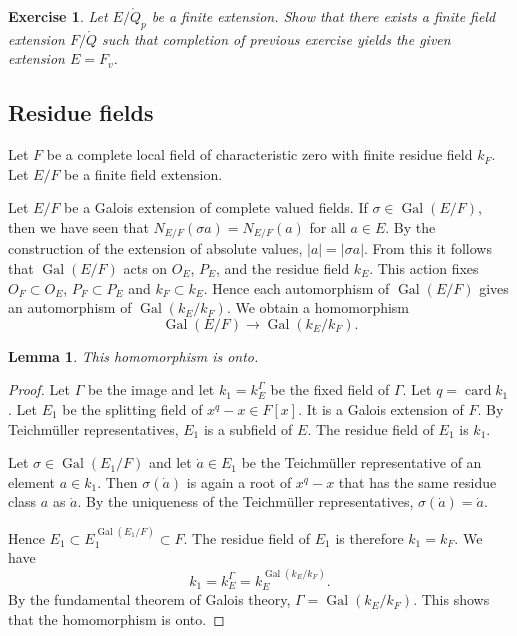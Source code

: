 \documentclass{amsart}
\newtheorem{lemma}[equation]{Lemma}
\newtheorem{exercise}{Exercise}
\def\card#1{\op{card}{#1}}
\def\abs#1{{|#1|}}
\def\op#1{{\operatorname{#1}}}
\def\oG{\op{Gal}}
\begin{document}

\begin{exercise}  Let $E/\ring{Q}_p$ be a finite extension.  Show that there
exists a finite field extension $F/\ring{Q}$ such that completion of previous
exercise yields the given extension $E=F_v$.
\end{exercise}

\subsection{Residue fields}

Let $F$ be a complete local field of characteristic zero with finite residue field $k_F$.
Let $E/F$ be a finite field extension.

Let $E/F$ be a Galois extension of complete valued fields.
If $\sigma\in\oG(E/F)$, then we have seen that $N_{E/F}(\sigma a) = N_{E/F}(a)$
for all $a\in E$.  By the construction of the extension of absolute values,
$\abs{a}=\abs{\sigma{a}}$.  From this it follows that $\oG(E/F)$
acts on $O_E$, $P_E$, and the residue field $k_E$.
This action fixes $O_F\subset O_E$, $P_F\subset P_E$ and $k_F\subset k_E$.
Hence each automorphism of $\oG(E/F)$ gives an automorphism of 
$\oG(k_E/k_F)$.  We obtain a homomorphism
\[
\oG(E/F)\to \oG(k_E/k_F).
\]

\begin{lemma} This homomorphism is onto.
\end{lemma}

\begin{proof} Let $\Gamma$ be the image and let $k_1 = k_E^\Gamma$ be the fixed
field of $\Gamma$.  Let $q=\card{k_1}$.  Let $E_1$ be the splitting field
of $x^q-x\in F[x]$.  It is a Galois extension of $F$.
By Teichm\"uller representatives, $E_1$ is a subfield
of $E$.  The residue field of $E_1$ is $k_1$.

Let $\sigma\in \oG(E_1/F)$ and let $\dot a\in E_1$ be 
the Teichm\"uller representative of an element $a\in k_1$.
Then $\sigma (\dot a)$ is again a root of $x^q-x$ that has the
same residue class $a$ as $\dot a$.  By the uniqueness of the Teichm\"uller
representatives, $\sigma(\dot a) = \dot a$.  

Hence $E_1\subset E_1^{\oG(E_1/F)} \subset F$.  The residue field of 
$E_1$ is therefore $k_1 = k_F$.  We have
\[
k_1 = k_E^\Gamma = k_E^{\oG(k_E/k_F)}.
\]
By the fundamental theorem of Galois theory, $\Gamma=\oG(k_E/k_F)$.
This shows that the homomorphism is onto.
\end{proof}
\end{document}
